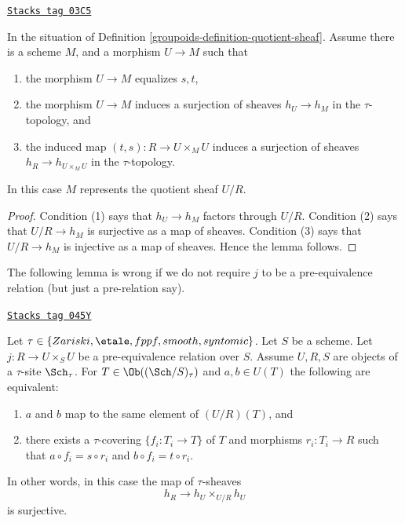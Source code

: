 \begin{lemma}
\label{groupoids-lemma-criterion-quotient-representable}
\href{https://stacks.math.columbia.edu/tag/03C5}{\texttt{Stacks tag 03C5}}

In the situation of Definition \ref{groupoids-definition-quotient-sheaf}.
Assume there is a scheme $M$, and a morphism $U \to M$ such that
\begin{enumerate}
\item the morphism $U \to M$ equalizes $s, t$,
\item the morphism $U \to M$ induces a surjection of sheaves
$h_U \to h_M$ in the $\tau$-topology, and
\item the induced map $(t, s) : R \to U \times_M U$ induces a
surjection of sheaves $h_R \to h_{U \times_M U}$ in the $\tau$-topology.
\end{enumerate}
In this case $M$ represents the quotient sheaf $U/R$.
\end{lemma}

\begin{proof}
Condition (1) says that $h_U \to h_M$ factors through $U/R$.
Condition (2) says that $U/R \to h_M$ is surjective as a map of sheaves.
Condition (3) says that $U/R \to h_M$ is injective as a map of sheaves.
Hence the lemma follows.
\end{proof}

The following lemma is wrong if we do not require $j$ to be a
pre-equivalence relation (but just a pre-relation say).

\begin{lemma}
\label{groupoids-lemma-quotient-pre-equivalence}
\href{https://stacks.math.columbia.edu/tag/045Y}{\texttt{Stacks tag 045Y}}

Let $\tau \in \{Zariski, \etale, fppf, smooth, syntomic\}$.
Let $S$ be a scheme.
Let $j : R \to U \times_S U$ be a pre-equivalence relation over $S$.
Assume $U, R, S$ are objects of a $\tau$-site $\Sch_\tau$.
For $T \in \Ob((\Sch/S)_\tau)$ and
$a, b \in U(T)$ the following are equivalent:
\begin{enumerate}
\item $a$ and $b$ map to the same element of $(U/R)(T)$, and
\item there exists a $\tau$-covering $\{f_i : T_i \to T\}$ of $T$
and morphisms $r_i : T_i \to R$ such that
$a \circ f_i = s \circ r_i$ and $b \circ f_i = t \circ r_i$.
\end{enumerate}
In other words, in this case the map of $\tau$-sheaves
$$
h_R \longrightarrow h_U \times_{U/R} h_U
$$
is surjective.
\end{lemma}

